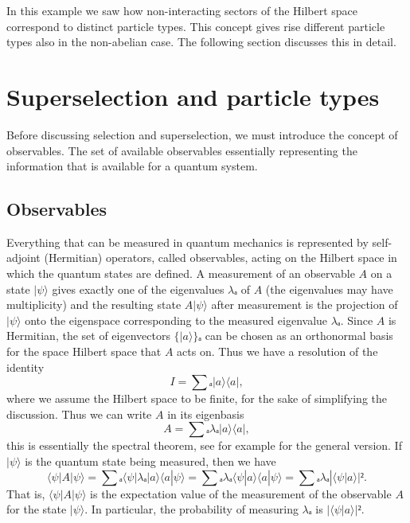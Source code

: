 In this example we saw how non-interacting sectors of the Hilbert space correspond to distinct particle types. This concept gives rise different particle types also in the non-abelian case. The following section discusses this in detail.



































\section{Superselection and particle types}\label{sec:observables}

Before discussing selection and superselection, we must introduce the concept of observables. The set of available observables essentially representing the information that is available for a quantum system.

\subsection{Observables}\label{sec:global vs relative phase}

Everything that can be measured in quantum mechanics is represented by self-adjoint (Hermitian) operators, called observables, acting on the Hilbert space in which the quantum states are defined. A measurement of an observable $A$ on a state $|ψ⟩$ gives exactly one of the eigenvalues $λₐ$ of $A$ (the eigenvalues may have multiplicity) and the resulting state $A|ψ⟩$ after measurement is the projection of $|ψ⟩$ onto the eigenspace corresponding to the measured eigenvalue $λₐ$. Since $A$ is Hermitian, the set of eigenvectors $\{|a⟩\}ₐ$ can be chosen as an orthonormal basis for the space Hilbert space that $A$ acts on. Thus we have a resolution of the identity
\begin{equation}
  I = ∑ₐ |a⟩⟨a|,
\end{equation}
where we assume the Hilbert space to be finite, for the sake of simplifying the discussion. Thus we can write $A$ in its eigenbasis
\begin{equation}
  A = ∑ₐ λₐ |a⟩⟨a|,
\end{equation}
this is essentially the spectral theorem, see for example \cite{reed-simon} for the general version. If $|ψ⟩$ is the quantum state being measured, then we have
\begin{equation}
  ⟨ψ|A|ψ⟩
  = ∑ₐ ⟨ψ|λₐ|a⟩⟨a|ψ⟩
  = ∑ₐ λₐ ⟨ψ|a⟩⟨a|ψ⟩
  = ∑ₐ λₐ |⟨ψ|a⟩|².
\end{equation}
That is, $⟨ψ|A|ψ⟩$ is the expectation value of the measurement of the observable $A$ for the state $|ψ⟩$. In particular, the probability of measuring $λₐ$ is $|⟨ψ|a⟩|²$.

